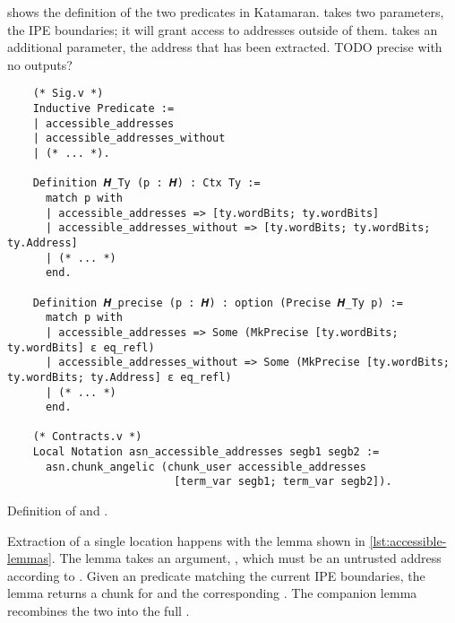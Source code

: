 shows the definition of the two predicates in Katamaran.  takes two parameters, the IPE boundaries; it will grant access to addresses outside of them.  takes an additional parameter, the address that has been extracted. TODO precise with no outputs?

\begin{listing}
  \begin{verbatim}
    (* Sig.v *)
    Inductive Predicate :=
    | accessible_addresses
    | accessible_addresses_without
    | (* ... *).

    Definition 𝑯_Ty (p : 𝑯) : Ctx Ty :=
      match p with
      | accessible_addresses => [ty.wordBits; ty.wordBits]
      | accessible_addresses_without => [ty.wordBits; ty.wordBits; ty.Address]
      | (* ... *)
      end.

    Definition 𝑯_precise (p : 𝑯) : option (Precise 𝑯_Ty p) :=
      match p with
      | accessible_addresses => Some (MkPrecise [ty.wordBits; ty.wordBits] ε eq_refl)
      | accessible_addresses_without => Some (MkPrecise [ty.wordBits; ty.wordBits; ty.Address] ε eq_refl)
      | (* ... *)
      end.

    (* Contracts.v *)
    Local Notation asn_accessible_addresses segb1 segb2 :=
      asn.chunk_angelic (chunk_user accessible_addresses
                          [term_var segb1; term_var segb2]).
  \end{verbatim}
  \caption{Definition of  and .}
  \label{lst:accessible_addresses}
\end{listing}

Extraction of a single location happens with the  lemma shown in \cref{lst:accessible-lemmas}. The lemma takes an argument, , which must be an untrusted address according to . Given an  predicate matching the current IPE boundaries, the lemma returns a  chunk for  and the corresponding . The companion lemma  recombines the two into the full .

